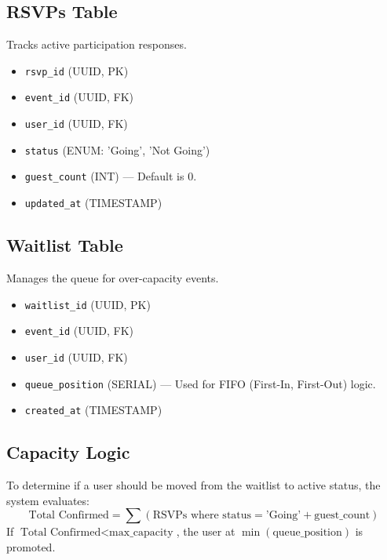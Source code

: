 \documentclass[11pt]{article}
\begin{document}
\subsection{RSVPs Table}
Tracks active participation responses.
\begin{itemize}
    \item \texttt{rsvp\_id} (UUID, PK)
    \item \texttt{event\_id} (UUID, FK)
    \item \texttt{user\_id} (UUID, FK)
    \item \texttt{status} (ENUM: 'Going', 'Not Going')
    \item \texttt{guest\_count} (INT) --- Default is 0.
    \item \texttt{updated\_at} (TIMESTAMP)
\end{itemize}

\subsection{Waitlist Table}
Manages the queue for over-capacity events.
\begin{itemize}
    \item \texttt{waitlist\_id} (UUID, PK)
    \item \texttt{event\_id} (UUID, FK)
    \item \texttt{user\_id} (UUID, FK)
    \item \texttt{queue\_position} (SERIAL) --- Used for FIFO (First-In, First-Out) logic.
    \item \texttt{created\_at} (TIMESTAMP)
\end{itemize}

\subsection{Capacity Logic}
To determine if a user should be moved from the waitlist to active status, the system evaluates:
$$ \text{Total Confirmed} = \sum (\text{RSVPs where status} = \text{'Going'} + \text{guest\_count}) $$
If $\text{Total Confirmed} < \text{max\_capacity}$, the user at $\min(\text{queue\_position})$ is promoted.
\end{document}
